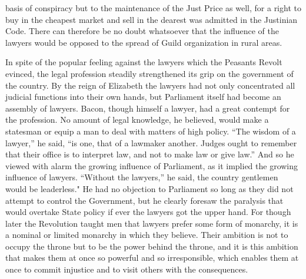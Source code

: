 \documentclass{book}
\begin{document}
basis of conspiracy but to the maintenance of the Just Price as well, for a right to buy in the cheapest market and sell in the dearest was admitted in the Justinian Code. There can therefore be no doubt whatsoever that the influence of the lawyers would be opposed to the spread of Guild organization in rural areas.

In spite of the popular feeling against the lawyers which the Peasants Revolt evinced, the legal profession steadily strengthened its grip on the government of the country. By the reign of Elizabeth the lawyers had not only concentrated all judicial functions into their own hands, but Parliament itself had become an assembly of lawyers. Bacon, though himself a lawyer, had a great contempt for the profession. No amount of legal knowledge, he believed, would make a statesman or equip a man to deal with matters of high policy. “The wisdom of a lawyer,” he said, “is one, that of a lawmaker another. Judges ought to remember that their office is to interpret law, and not to make law or give law.” And so he viewed with alarm the growing influence of Parliament, as it implied the growing influence of lawyers. “Without the lawyers,” he said, the country gentlemen would be leaderless." He had no objection to Parliament so long as they did not attempt to control the Government, but he clearly foresaw the paralysis that would overtake State policy if ever the lawyers got the upper hand. For though later the Revolution taught men that lawyers prefer some form of monarchy, it is a nominal or limited monarchy in which they believe. Their ambition is not to occupy the throne but to be the power behind the throne, and it is this ambition that makes them at once so powerful and so irresponsible, which enables them at once to commit injustice and to visit others with the consequences.
\end{document}
